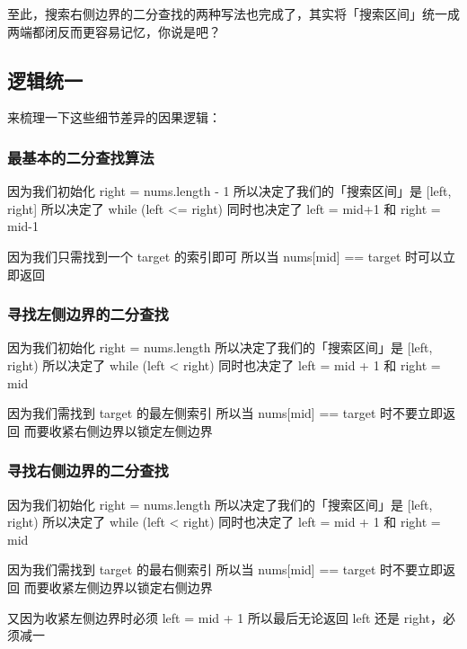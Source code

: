 \documentclass[12pt]{article}
\begin{document}
至此，搜索右侧边界的二分查找的两种写法也完成了，其实将「搜索区间」统一成两端都闭反而更容易记忆，你说是吧？

\subsection{逻辑统一}
来梳理一下这些细节差异的因果逻辑：

\subsubsection{最基本的二分查找算法}
\begin{framed}
因为我们初始化 right = nums.length - 1
所以决定了我们的「搜索区间」是 [left, right]
所以决定了 while (left <= right)
同时也决定了 left = mid+1 和 right = mid-1

因为我们只需找到一个 target 的索引即可
所以当 nums[mid] == target 时可以立即返回
\end{framed}

\subsubsection{寻找左侧边界的二分查找}
\begin{framed}
因为我们初始化 right = nums.length
所以决定了我们的「搜索区间」是 [left, right)
所以决定了 while (left < right)
同时也决定了 left = mid + 1 和 right = mid

因为我们需找到 target 的最左侧索引
所以当 nums[mid] == target 时不要立即返回
而要收紧右侧边界以锁定左侧边界
\end{framed}

\subsubsection{寻找右侧边界的二分查找}
\begin{framed}
因为我们初始化 right = nums.length
所以决定了我们的「搜索区间」是 [left, right)
所以决定了 while (left < right)
同时也决定了 left = mid + 1 和 right = mid

因为我们需找到 target 的最右侧索引
所以当 nums[mid] == target 时不要立即返回
而要收紧左侧边界以锁定右侧边界

又因为收紧左侧边界时必须 left = mid + 1
所以最后无论返回 left 还是 right，必须减一
\end{framed}
\end{document}
